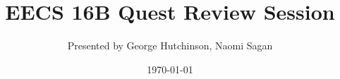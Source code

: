 

\title{EECS 16B Quest Review Session}
\author{Presented by George Hutchinson, Naomi Sagan}
\date{\today}

\newcommand{\SlideAccessingLogistics}{@\#}













%
 
%








